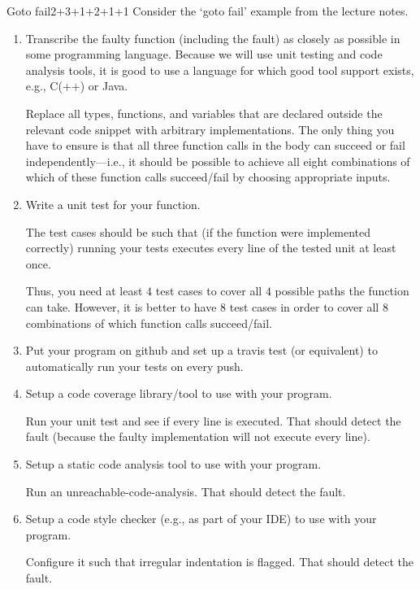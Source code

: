 \documentclass[a4paper]{article}
\begin{document}
\header

\begin{problem}{Goto fail}{2+3+1+2+1+1}
Consider the `goto fail' example from the lecture notes.

\begin{enumerate}
\item Transcribe the faulty function (including the fault) as closely as possible in some programming language.
Because we will use unit testing and code analysis tools, it is good to use a language for which good tool support exists, e.g., C(++) or Java.

Replace all types, functions, and variables that are declared outside the relevant code snippet with arbitrary implementations.
The only thing you have to ensure is that all three function calls in the body can succeed or fail independently---i.e., it should be possible to achieve all eight combinations of which of these function calls succeed/fail by choosing appropriate inputs.

\item Write a unit test for your function.

The test cases should be such that (if the function were implemented correctly) running your tests executes every line of the tested unit at least once.

Thus, you need at least $4$ test cases to cover all $4$ possible paths the function can take.
However, it is better to have $8$ test cases in order to cover all $8$ combinations of which function calls succeed/fail.

\item Put your program on github and set up a travis test (or equivalent) to automatically run your tests on every push.

\item Setup a code coverage library/tool to use with your program.

Run your unit test and see if every line is executed.
That should detect the fault (because the faulty implementation will not execute every line).

\item Setup a static code analysis tool to use with your program.

Run an unreachable-code-analysis.
That should detect the fault.

\item Setup a code style checker (e.g., as part of your IDE) to use with your program.

Configure it such that irregular indentation is flagged.
That should detect the fault.
\end{enumerate}


\end{problem}
\end{document}
